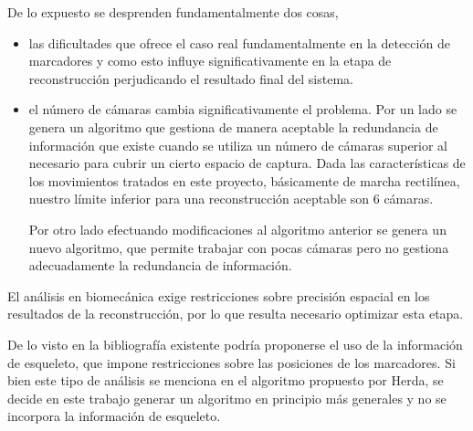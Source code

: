 De lo expuesto se desprenden fundamentalmente dos cosas,
\begin{itemize}
\item las dificultades que ofrece el caso real fundamentalmente en la detección de marcadores y como esto influye significativamente en la etapa de reconstrucción perjudicando el resultado final del sistema.
\item el número de cámaras cambia significativamente el problema. Por un lado se genera un algoritmo que gestiona de manera aceptable la redundancia de información que existe cuando se utiliza un número de cámaras superior al necesario para cubrir un cierto espacio de captura. Dada las características de los movimientos tratados en este proyecto, básicamente de marcha rectilínea, nuestro límite inferior para  una reconstrucción aceptable son 6 cámaras.

 Por otro lado efectuando modificaciones al algoritmo anterior se genera un nuevo algoritmo, que permite trabajar con pocas cámaras pero no gestiona adecuadamente la redundancia de información.
\end{itemize} 

El análisis en biomecánica exige restricciones sobre precisión espacial en los resultados de la reconstrucción, por lo que resulta necesario optimizar esta etapa. 

De lo visto en la bibliografía existente podría proponerse el uso de la información de esqueleto, que impone restricciones sobre las posiciones de los marcadores. Si bien este tipo de análisis se menciona en el algoritmo propuesto por Herda, se decide en este trabajo generar un algoritmo en principio más generales y no se incorpora la información de esqueleto. \\
 
 
 
